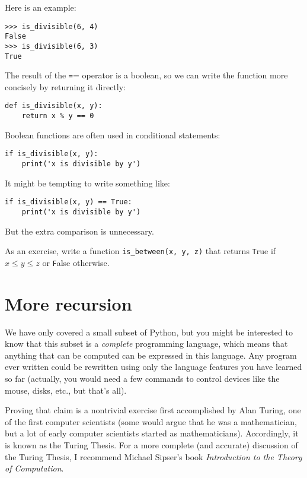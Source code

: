 \documentclass[
DIV=11,
fontsize=12,
twoside,
headinclude=false,
titlepage=firstiscover,
abstract=true,
headsepline=true,
footsepline=true,
chapterprefix=true, %
headings=big,
bibliography=totoc,%
captions=tableheading
]{scrbook}
\theoremstyle{definition}
\begin{document}
Here is an example:

\begin{lstlisting}
>>> is_divisible(6, 4)
False
>>> is_divisible(6, 3)
True
\end{lstlisting}
%
The result of the {\texttt ==} operator is a boolean, so we can write the
function more concisely by returning it directly:

\begin{lstlisting}
def is_divisible(x, y):
    return x % y == 0
\end{lstlisting}
%
Boolean functions are often used in conditional statements:

\begin{lstlisting}
if is_divisible(x, y):
    print('x is divisible by y')
\end{lstlisting}
%
It might be tempting to write something like:

\begin{lstlisting}
if is_divisible(x, y) == True:
    print('x is divisible by y')
\end{lstlisting}
%
But the extra comparison is unnecessary.

As an exercise, write a function \verb"is_between(x, y, z)" that
returns {\texttt True} if $x \le y \le z$ or {\texttt False} otherwise.


\section{More recursion}
\label{more.recursion}

We have only covered a small subset of Python, but you might
be interested to know that this subset is a {\em complete}
programming language, which means that anything that can be
computed can be expressed in this language.  Any program ever written
could be rewritten using only the language features you have learned
so far (actually, you would need a few commands to control devices
like the mouse, disks, etc., but that's all).

Proving that claim is a nontrivial exercise first accomplished by Alan
Turing, one of the first computer scientists (some would argue that he
was a mathematician, but a lot of early computer scientists started as
mathematicians).  Accordingly, it is known as the Turing Thesis.
For a more complete (and accurate) discussion of the Turing Thesis,
I recommend Michael Sipser's book {\em Introduction to the
Theory of Computation}.
\end{document}
